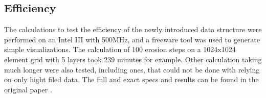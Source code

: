 \subsection{Efficiency}
The calculations to test the efficiency of the newly introduced data structure were performed on an Intel III with 500MHz, and a freeware tool was used to generate simple visualizations. The calculation of 100 erosion steps on a 1024x1024 element grid with 5 layers took 239 minutes for example. Other calculation taking much longer were also tested, including ones, that could not be done with relying on only hight filed data. The full and exact specs and results can be found in the original paper \cite{marechal2010heat}.